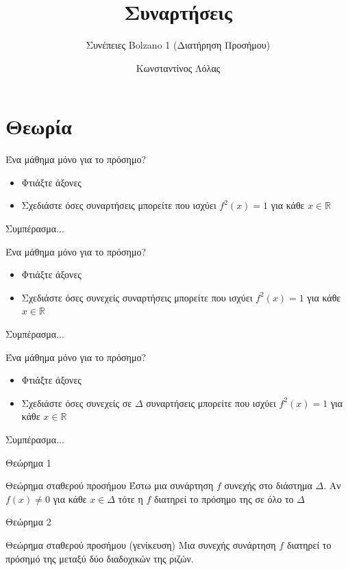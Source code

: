 \documentclass{presentation}
\title{Συναρτήσεις}
\subtitle{Συνέπειες Bolzano 1 (Διατήρηση Προσήμου)}
\author[Λόλας]{Κωνσταντίνος Λόλας}
\begin{document}
\begin{frame}
  \titlepage
\end{frame}

\section{Θεωρία}
\begin{frame}{Ένα μάθημα μόνο για το πρόσημο?}
  \begin{itemize}[<+->]
    \item Φτιάξτε άξονες
    \item Σχεδιάστε όσες συναρτήσεις μπορείτε που ισχύει $f^2(x)=1$ για κάθε $x\in \mathbb{R}$
  \end{itemize}
  Συμπέρασμα...
\end{frame}

\begin{frame}{Ένα μάθημα μόνο για το πρόσημο?}
  \begin{itemize}[<+->]
    \item Φτιάξτε άξονες
    \item Σχεδιάστε όσες συνεχείς συναρτήσεις μπορείτε που ισχύει $f^2(x)=1$ για κάθε $x\in \mathbb{R}$
  \end{itemize}
  Συμπέρασμα...
\end{frame}

\begin{frame}{Ένα μάθημα μόνο για το πρόσημο?}
  \begin{itemize}[<+->]
    \item Φτιάξτε άξονες
    \item Σχεδιάστε όσες συνεχείς σε $Δ$ συναρτήσεις μπορείτε που ισχύει $f^2(x)=1$ για κάθε $x\in \mathbb{R}$
  \end{itemize}
  Συμπέρασμα...
\end{frame}

\begin{frame}{Θεώρημα 1}
  \begin{block}{Θεώρημα σταθερού προσήμου}
    Έστω μια συνάρτηση $f$ συνεχής στο διάστημα $Δ$. Αν $f(x)\ne 0$ για κάθε $x\in Δ$ τότε η $f$ διατηρεί το πρόσημο της σε όλο το $Δ$
  \end{block}
\end{frame}

\begin{frame}{Θεώρημα 2}
  \begin{block}{Θεώρημα σταθερού προσήμου (γενίκευση)}
    Μια συνεχής συνάρτηση $f$ διατηρεί το πρόσημό της μεταξύ δύο διαδοχικών της ριζών.
  \end{block}
\end{frame}
\end{document}
